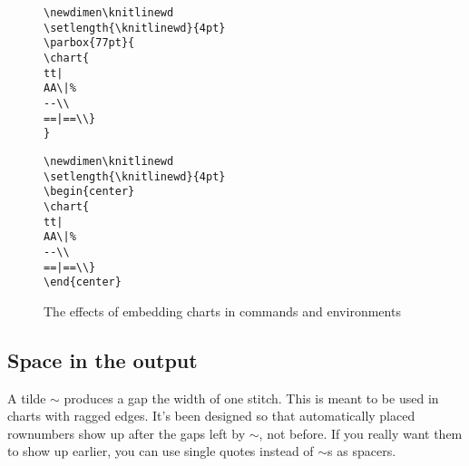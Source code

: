 \documentclass[draft]{amsart}
\begin{document}
\begin{figure}
\caption{The effects of embedding charts in commands and environments}
\par\bigskip\par
\begin{minipage}[b]{2.5in}
\begin{verbatim}
\newdimen\knitlinewd 
\setlength{\knitlinewd}{4pt}
\parbox{77pt}{
\chart{
tt|
AA\|%
--\\
==|==\\}
}
\end{verbatim}
\end{minipage}%
\hskip -108pt
\begin{minipage}[b]{80pt}
\newdimen\knitlinewd 
\setlength{\knitlinewd}{4pt}
\parbox{80pt}{
}
\vspace{24pt}
\end{minipage}%
\hskip 12pt
\begin{minipage}[b]{2.5in}
\begin{verbatim}
\newdimen\knitlinewd 
\setlength{\knitlinewd}{4pt}
\begin{center}
\chart{
tt|
AA\|%
--\\
==|==\\}
\end{center}
\end{verbatim}
\end{minipage}%
\hskip -84pt
\begin{minipage}[b]{55pt}
\newdimen\knitlinewd 
\setlength{\knitlinewd}{4pt}
\begin{center}
\end{center}
\vspace{24pt}
\end{minipage}
\end{figure}

\let \knitlinewd \saveknitlinewd

\subsection{Space in the output}

A tilde $\sim$ produces a gap the width of one stitch. This is meant to be used in charts with ragged edges. It's been designed so that automatically placed rownumbers show up {after} the gaps left by $\sim$, not before. If you really want them to show up earlier, you can use single quotes instead of $\sim$s as spacers.
\end{document}
